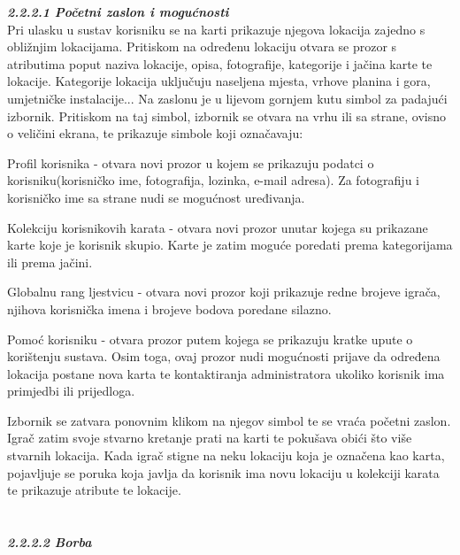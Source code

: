 		\textbf{\textit{\small2.2.2.1 Početni zaslon i mogućnosti}}\\
		
		
		{Pri ulasku u sustav korisniku se na karti prikazuje njegova lokacija zajedno s obližnjim lokacijama. Pritiskom na određenu lokaciju otvara se prozor s atributima poput naziva lokacije, opisa, fotografije, kategorije i jačina karte te lokacije. Kategorije lokacija uključuju naseljena mjesta, vrhove planina i gora, umjetničke instalacije... Na zaslonu je u lijevom gornjem kutu simbol za padajući izbornik. Pritiskom na taj simbol, izbornik se otvara na vrhu ili sa strane, ovisno o veličini ekrana, te prikazuje simbole koji označavaju:  }
		
			\begin{packed_item}
			\item {Profil korisnika - otvara novi prozor u kojem se prikazuju podatci o korisniku(korisničko ime, fotografija, lozinka, e-mail adresa). Za fotografiju i korisničko ime sa strane nudi se mogućnost uređivanja.}\\
			\item {Kolekciju korisnikovih karata - otvara novi prozor unutar kojega su prikazane karte koje je korisnik skupio. Karte je zatim moguće poredati prema kategorijama ili prema jačini.}\\
			\item {Globalnu rang ljestvicu - otvara novi prozor koji prikazuje redne brojeve igrača, njihova korisnička imena i brojeve bodova poredane silazno.}\\
			\item {Pomoć korisniku - otvara prozor putem kojega se prikazuju kratke upute o korištenju sustava. Osim toga, ovaj prozor nudi mogućnosti prijave da određena lokacija postane nova karta te kontaktiranja administratora ukoliko korisnik ima primjedbi ili prijedloga. }
			\end{packed_item}
		
		{Izbornik se zatvara ponovnim klikom na njegov simbol te se vraća početni zaslon. Igrač zatim svoje stvarno kretanje prati na karti te pokušava obići što više stvarnih lokacija. Kada igrač stigne na neku lokaciju koja je označena kao karta, pojavljuje se poruka koja javlja da korisnik ima novu lokaciju u kolekciji karata te prikazuje atribute te lokacije.}\\ \\ \\
		
		\textbf{\textit{\small2.2.2.2 Borba}}\\
		{}
		
		
		\eject
	